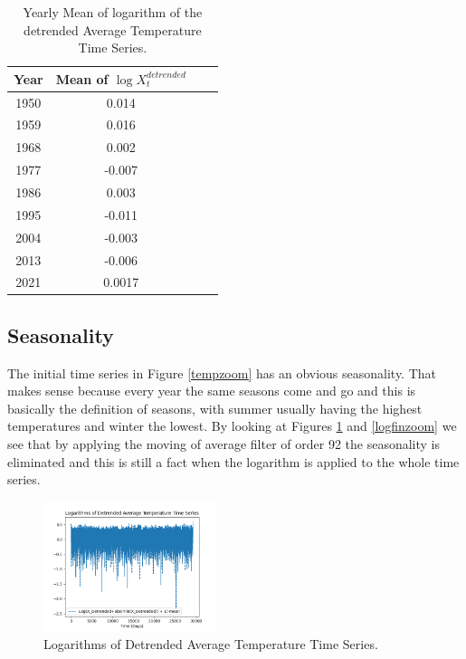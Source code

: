 \documentclass[conference]{IEEEtran}
\begin{document}
\begin{table}
\begin{center}
\begin{tabular}{||c||c||c||c||} 
 \hline 
 Year & \makecell{Mean of\\$\log X_t^{detrended}$} \\ [0.5ex]
 \hline\hline
 1950 & 0.014\\ 
 \hline
 1959 & 0.016\\
 \hline
 1968 & 0.002\\
 \hline
 1977 & -0.007\\
 \hline
 1986 & 0.003\\
 \hline
 1995 & -0.011\\
 \hline
 2004 & -0.003\\
 \hline
 2013 & -0.006\\
 \hline
 2021 & 0.0017\\
 \hline
\end{tabular}
\end{center}
\caption{Yearly Mean of logarithm of the detrended \break Average Temperature Time Series.}
\label{table1m}
\end{table}

\subsection{Seasonality}

The initial time series in Figure \ref{tempzoom} has an obvious seasonality. That makes sense because every year 
the same seasons come and go and this is basically the definition of seasons, with summer usually having the highest temperatures and winter the lowest. By looking at Figures \ref{logfin} and \ref{logfinzoom} we see that by applying the moving of average filter of order 92 the seasonality is eliminated and this is still a fact when the logarithm is applied to the whole time series.

\begin{figure}[ht]
    \centering
    \includegraphics[width=0.45\textwidth]{Figures/Logarithms of Detrended Average Temperature Time Series.png}
    \caption{Logarithms of Detrended Average Temperature Time Series.}
    \label{logfin}
\end{figure}
\end{document}
